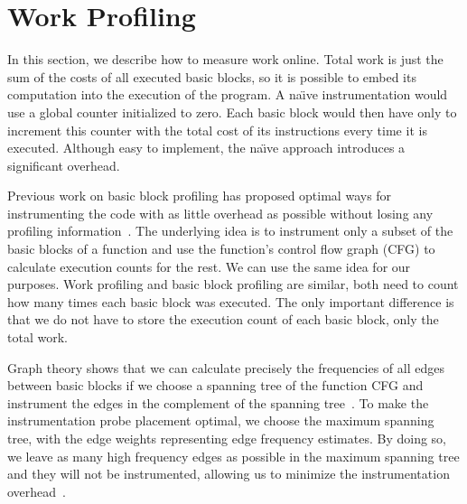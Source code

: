 \section{Work Profiling}\label{sec:prof}

In this section, we describe how to measure work online. Total work is just the sum of the costs of all executed basic blocks, so it is
possible to embed its computation into the execution of the program. A na\"{\i}ve instrumentation would use a global counter initialized 
to zero. Each basic block would then have only to increment this counter with the total cost of its
instructions every time it is executed. Although easy to implement, the na\"{\i}ve approach introduces a significant overhead.

Previous work on basic block profiling has proposed optimal ways for instrumenting the code with as little overhead as possible without
losing any profiling information~\citep{knuth73,ball94}. The underlying idea is to instrument only a subset of the basic blocks of a
function and use the function's control flow graph (CFG) to calculate execution counts for the rest. We can use the same idea for our
purposes. Work profiling and basic block profiling are similar, both need to count how many times each basic block was executed. The only
important difference is that we do not have to store the execution count of each basic block, only the total work.

Graph theory shows that we can calculate precisely the frequencies of all edges between basic blocks if we choose a spanning tree of the
function CFG and instrument the edges in the complement of the spanning tree~\cite{nahapetian73,forman81}.
To make the instrumentation probe placement optimal, we choose the maximum spanning tree,
with the edge weights representing edge frequency estimates. By doing so, we leave as many high frequency edges as possible in the
maximum spanning tree and they will not be instrumented, allowing us to minimize the instrumentation overhead~\cite{forman81,ball94}.

